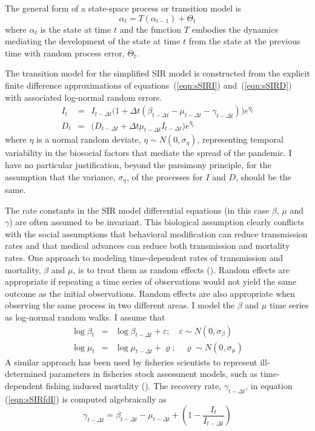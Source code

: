 \documentclass[12pt,letterpaper]{article}
\begin{document}
The general form of a state-space process or transition model is
\begin{equation}
\alpha_t=T(\alpha_{t-1}) + \Theta_t
\end{equation}
where $\alpha_t$ is the state at time $t$ and 
the function $T$ embodies the dynamics mediating the
development of the state at time $t$ from the state at the previous
time with random process error, $\Theta_t$.

The transition model for the simplified SIR model is constructed from
the explicit finite difference
approximations of equations~(\ref{eqn:sSIRI}) and~(\ref{eqn:sSIRD}) 
with associated log-normal
random errors.
\begin{eqnarray}
\label{eqn:sSIRfdI}
I_t &=& I_{t-\Delta t}\big(1+\Delta t(\beta_{t-\Delta t} - \mu_{t-\Delta t}
- \gamma_{t-\Delta t})\big)e^{\eta_t}\\
\label{eqn:sSIRfdD}
D_t &=& \big(D_{t-\Delta t} + \Delta t \mu_{t-\Delta t}I_{t-\Delta
t}\big)e^{\eta_t}
\end{eqnarray}
where $\eta$ is a normal random deviate, $\eta\sim
N(0,\sigma_\eta)$, representing temporal variability in the biosocial
factors that mediate the spread of the pandemic. 
I have no particular justification, beyond the parsimony principle,
for the assumption that the variance, $\sigma_\eta$, of the processes
for $I$ and $D$, should be the same.

The rate constants in the SIR model differential equations (in this
case $\beta$, $\mu$ and $\gamma$) are often assumed to be invariant.
This biological assumption clearly conflicts with the social
assumptions
that behavioral modification can reduce transmission rates and
that medical advances can reduce both transmission and mortality
rates.
One approach to modeling time-dependent rates of transmission and
mortality, $\beta$ and $\mu$, is to treat them as random effects
(\cite{Skaug2006}). Random effects are appropriate if repeating a time
series of observations would not yield the same outcome as the initial
observations. Random effects are also appropriate when observing
the same process in two different areas. I model the  $\beta$ and
$\mu$ time series as log-normal random walks. I assume that
\begin{eqnarray}
\log\beta_t &=& \log\beta_{t-\Delta t}+\varepsilon;\quad \varepsilon\sim 
N(0,\sigma_\beta)\\
\log\mu_t &=& \log\mu_{t-\Delta t}+\varrho;\quad \varrho\sim
N(0,\sigma_\mu)
\end{eqnarray}
A similar approach has been used by fisheries scientists to represent
ill-determined parameters in fisheries stock assessment models, such
as time-dependent fishing induced mortality
(\cite{Nielsen2014b,Sibert2017}).
The recovery rate, $\gamma_{t-\Delta t}$, in equation
(\ref{eqn:sSIRfdI}) is computed algebraically as
\begin{equation}
\gamma_{t-\Delta t} = \beta_{t-\Delta t} - \mu_{t-\Delta t} +
(1-\frac{I_t}{I_{t-\Delta t}})
\end{equation}
\end{document}
